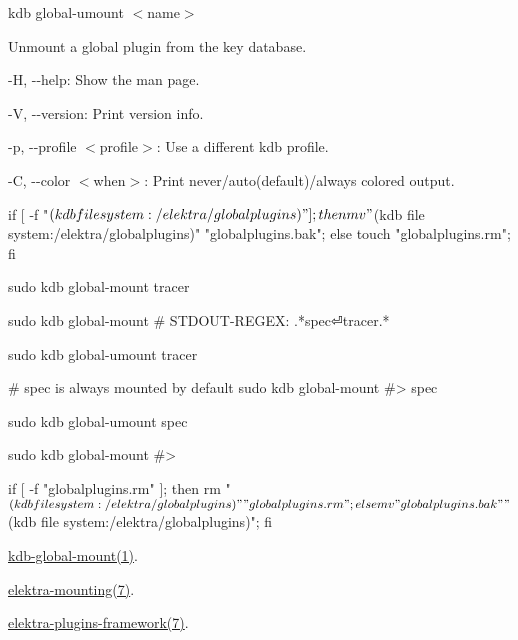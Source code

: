 {\ttfamily kdb global-\/umount $<$name$>$}

Unmount a global plugin from the key database.


\begin{DoxyItemize}
\item {\ttfamily -\/H}, {\ttfamily -\/-\/help}\+: Show the man page.
\item {\ttfamily -\/V}, {\ttfamily -\/-\/version}\+: Print version info.
\item {\ttfamily -\/p}, {\ttfamily -\/-\/profile $<$profile$>$}\+: Use a different kdb profile.
\item {\ttfamily -\/C}, {\ttfamily -\/-\/color $<$when$>$}\+: Print never/auto(default)/always colored output.
\end{DoxyItemize}


\begin{DoxyCode}
if [ -f "$(kdb file system:/elektra/globalplugins)" ]; then mv "$(kdb file system:/elektra/globalplugins)"
       "globalplugins.bak"; else touch "globalplugins.rm"; fi

sudo kdb global-mount tracer

sudo kdb global-mount
# STDOUT-REGEX: .*spec⏎tracer.*

sudo kdb global-umount tracer

# spec is always mounted by default
sudo kdb global-mount
#> spec

sudo kdb global-umount spec

sudo kdb global-mount
#>

if [ -f "globalplugins.rm" ]; then rm "$(kdb file system:/elektra/globalplugins)" "globalplugins.rm"; else
       mv "globalplugins.bak" "$(kdb file system:/elektra/globalplugins)"; fi
\end{DoxyCode}



\begin{DoxyItemize}
\item \hyperlink{doc_help_kdb-global-mount_md}{kdb-\/global-\/mount(1)}.
\item \hyperlink{doc_help_elektra-mounting_md}{elektra-\/mounting(7)}.
\item \hyperlink{doc_dev_plugins-framework_md}{elektra-\/plugins-\/framework(7)}. 
\end{DoxyItemize}